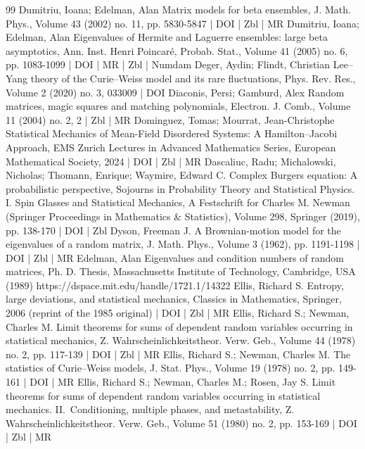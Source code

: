 \begin{thebibliography}{99}
Dumitriu, Ioana; Edelman, Alan Matrix models for beta ensembles, J. Math. Phys., Volume 43 (2002) no. 11, pp. 5830-5847 | DOI | Zbl | MR
Dumitriu, Ioana; Edelman, Alan Eigenvalues of Hermite and Laguerre ensembles: large beta asymptotics, Ann. Inst. Henri Poincaré, Probab. Stat., Volume 41 (2005) no. 6, pp. 1083-1099 | DOI | MR | Zbl | Numdam
Deger, Aydin; Flindt, Christian Lee–Yang theory of the Curie–Weiss model and its rare fluctuations, Phys. Rev. Res., Volume 2 (2020) no. 3, 033009 | DOI
Diaconis, Persi; Gamburd, Alex Random matrices, magic squares and matching polynomials, Electron. J. Comb., Volume 11 (2004) no. 2, 2 | Zbl | MR
Dominguez, Tomas; Mourrat, Jean-Christophe Statistical Mechanics of Mean-Field Disordered Systems: A Hamilton–Jacobi Approach, EMS Zurich Lectures in Advanced Mathematics Series, European Mathematical Society, 2024 | DOI | Zbl | MR
Dascaliuc, Radu; Michalowski, Nicholas; Thomann, Enrique; Waymire, Edward C. Complex Burgers equation: A probabilistic perspective, Sojourns in Probability Theory and Statistical Physics. I. Spin Glasses and Statistical Mechanics, A Festschrift for Charles M. Newman (Springer Proceedings in Mathematics \& Statistics), Volume 298, Springer (2019), pp. 138-170 | DOI | Zbl
Dyson, Freeman J. A Brownian-motion model for the eigenvalues of a random matrix, J. Math. Phys., Volume 3 (1962), pp. 1191-1198 | DOI | Zbl | MR
Edelman, Alan Eigenvalues and condition numbers of random matrices, Ph. D. Thesis, Massachusetts Institute of Technology, Cambridge, USA (1989) https://dspace.mit.edu/handle/1721.1/14322
Ellis, Richard S. Entropy, large deviations, and statistical mechanics, Classics in Mathematics, Springer, 2006 (reprint of the 1985 original) | DOI | Zbl | MR
Ellis, Richard S.; Newman, Charles M. Limit theorems for sums of dependent random variables occurring in statistical mechanics, Z. Wahrscheinlichkeitstheor. Verw. Geb., Volume 44 (1978) no. 2, pp. 117-139 | DOI | Zbl | MR
Ellis, Richard S.; Newman, Charles M. The statistics of Curie–Weiss models, J. Stat. Phys., Volume 19 (1978) no. 2, pp. 149-161 | DOI | MR
Ellis, Richard S.; Newman, Charles M.; Rosen, Jay S. Limit theorems for sums of dependent random variables occurring in statistical mechanics. II. Conditioning, multiple phases, and metastability, Z. Wahrscheinlichkeitstheor. Verw. Geb., Volume 51 (1980) no. 2, pp. 153-169 | DOI | Zbl | MR

\end{thebibliography}
